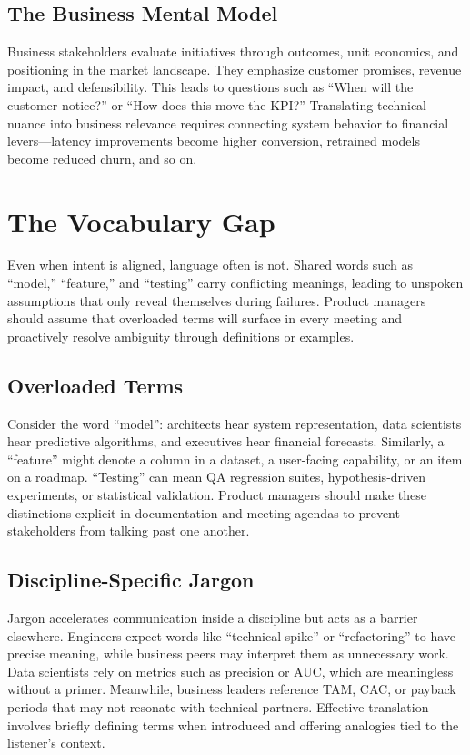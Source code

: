 \subsection{The Business Mental Model}
Business stakeholders evaluate initiatives through outcomes, unit economics, and positioning in the market landscape. They emphasize customer promises, revenue impact, and defensibility. This leads to questions such as ``When will the customer notice?'' or ``How does this move the KPI?'' Translating technical nuance into business relevance requires connecting system behavior to financial levers—latency improvements become higher conversion, retrained models become reduced churn, and so on.

\section{The Vocabulary Gap}
\label{sec:vocabulary-gap}

Even when intent is aligned, language often is not. Shared words such as ``model,'' ``feature,'' and ``testing'' carry conflicting meanings, leading to unspoken assumptions that only reveal themselves during failures. Product managers should assume that overloaded terms will surface in every meeting and proactively resolve ambiguity through definitions or examples.

\subsection{Overloaded Terms}
Consider the word ``model'': architects hear system representation, data scientists hear predictive algorithms, and executives hear financial forecasts. Similarly, a ``feature'' might denote a column in a dataset, a user-facing capability, or an item on a roadmap. ``Testing'' can mean QA regression suites, hypothesis-driven experiments, or statistical validation. Product managers should make these distinctions explicit in documentation and meeting agendas to prevent stakeholders from talking past one another.

\subsection{Discipline-Specific Jargon}
Jargon accelerates communication inside a discipline but acts as a barrier elsewhere. Engineers expect words like ``technical spike'' or ``refactoring'' to have precise meaning, while business peers may interpret them as unnecessary work. Data scientists rely on metrics such as precision or AUC, which are meaningless without a primer. Meanwhile, business leaders reference TAM, CAC, or payback periods that may not resonate with technical partners. Effective translation involves briefly defining terms when introduced and offering analogies tied to the listener's context.

